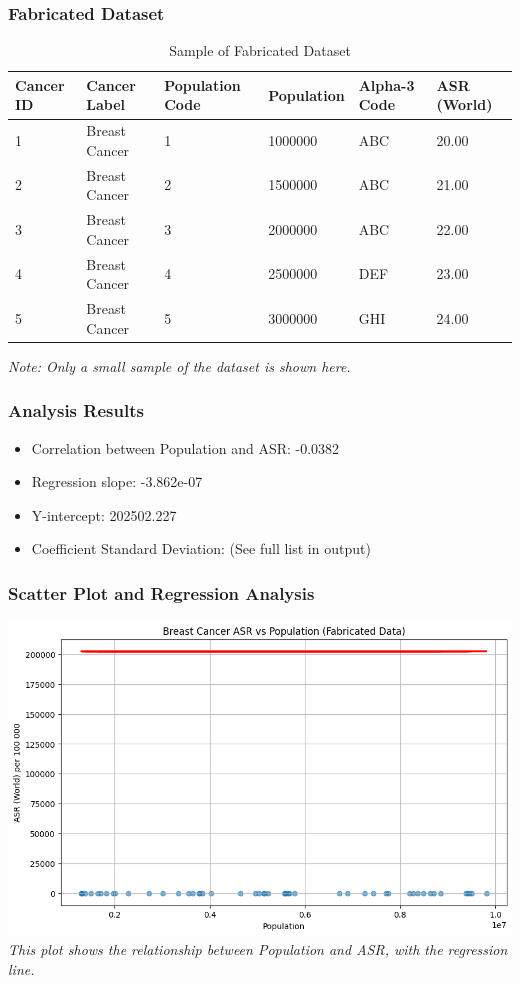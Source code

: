 \begin{frame}
  \frametitle{Fabricated Dataset}
  \begin{table}
    \centering
    \begin{tabular}{p{1.2cm} p{1.8cm} p{1.5cm} p{1.5cm} p{1.5cm} p{1.2cm}}
      \toprule
      Cancer ID & Cancer Label & Population Code & Population & Alpha-3 Code & ASR (World) \\
      \midrule
      1 & Breast Cancer & 1 & 1000000 & ABC & 20.00 \\
      2 & Breast Cancer & 2 & 1500000 & ABC & 21.00 \\
      3 & Breast Cancer & 3 & 2000000 & ABC & 22.00 \\
      4 & Breast Cancer & 4 & 2500000 & DEF & 23.00 \\
      5 & Breast Cancer & 5 & 3000000 & GHI & 24.00 \\
      \bottomrule
    \end{tabular}
    \caption{Sample of Fabricated Dataset}
    \label{tab:fabricated_data}
  \end{table}
  \textit{Note: Only a small sample of the dataset is shown here.}
\end{frame}

\begin{frame}
  \frametitle{Analysis Results}
  \begin{itemize}
    \item Correlation between Population and ASR: -0.0382
    \item Regression slope: -3.862e-07
    \item Y-intercept: 202502.227
    \item Coefficient Standard Deviation: (See full list in output)
  \end{itemize}
\end{frame}

\begin{frame}
  \frametitle{Scatter Plot and Regression Analysis}
  \includegraphics[width=\textwidth]{./images/analysis.png}
  \textit{This plot shows the relationship between Population and ASR, with the regression line.}
\end{frame}

